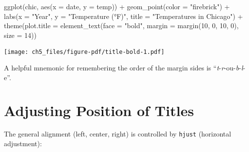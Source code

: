 \documentclass[
  letterpaper,
]{scrbook}
\newenvironment{Shaded}{\begin{snugshade}}{\end{snugshade}}
\newcommand{\AttributeTok}[1]{\textcolor[rgb]{0.40,0.45,0.13}{#1}}
\newcommand{\DecValTok}[1]{\textcolor[rgb]{0.68,0.00,0.00}{#1}}
\newcommand{\FunctionTok}[1]{\textcolor[rgb]{0.28,0.35,0.67}{#1}}
\newcommand{\NormalTok}[1]{\textcolor[rgb]{0.00,0.23,0.31}{#1}}
\newcommand{\SpecialCharTok}[1]{\textcolor[rgb]{0.37,0.37,0.37}{#1}}
\newcommand{\StringTok}[1]{\textcolor[rgb]{0.13,0.47,0.30}{#1}}
\begin{document}
\begin{Shaded}
\begin{Highlighting}[]
\FunctionTok{ggplot}\NormalTok{(chic, }\FunctionTok{aes}\NormalTok{(}\AttributeTok{x =}\NormalTok{ date, }\AttributeTok{y =}\NormalTok{ temp)) }\SpecialCharTok{+}
  \FunctionTok{geom\_point}\NormalTok{(}\AttributeTok{color =} \StringTok{"firebrick"}\NormalTok{) }\SpecialCharTok{+}
  \FunctionTok{labs}\NormalTok{(}\AttributeTok{x =} \StringTok{"Year"}\NormalTok{, }\AttributeTok{y =} \StringTok{"Temperature (°F)"}\NormalTok{,}
       \AttributeTok{title =} \StringTok{"Temperatures in Chicago"}\NormalTok{) }\SpecialCharTok{+}
  \FunctionTok{theme}\NormalTok{(}\AttributeTok{plot.title =} \FunctionTok{element\_text}\NormalTok{(}\AttributeTok{face =} \StringTok{"bold"}\NormalTok{,}
                                  \AttributeTok{margin =} \FunctionTok{margin}\NormalTok{(}\DecValTok{10}\NormalTok{, }\DecValTok{0}\NormalTok{, }\DecValTok{10}\NormalTok{, }\DecValTok{0}\NormalTok{),}
                                  \AttributeTok{size =} \DecValTok{14}\NormalTok{))}
\end{Highlighting}
\end{Shaded}

\texttt{[image: ch5\_files/figure-pdf/title-bold-1.pdf]}

\begin{tcolorbox}[enhanced jigsaw, rightrule=.15mm, arc=.35mm, title=\textcolor{quarto-callout-tip-color}{\faLightbulb}\hspace{0.5em}{Having trouble with Margins?}, colback=white, toptitle=1mm, colbacktitle=quarto-callout-tip-color!10!white, breakable, left=2mm, opacityback=0, leftrule=.75mm, bottomrule=.15mm, bottomtitle=1mm, colframe=quarto-callout-tip-color-frame, coltitle=black, toprule=.15mm, opacitybacktitle=0.6, titlerule=0mm]

A helpful mnemonic for remembering the order of the margin sides is
``\emph{t}-\emph{r}-ou-\emph{b}-\emph{l}-e''.

\end{tcolorbox}

\section{Adjusting Position of
Titles}\label{adjusting-position-of-titles}

The general alignment (left, center, right) is controlled by
\texttt{hjust} (horizontal adjustment):
\end{document}
